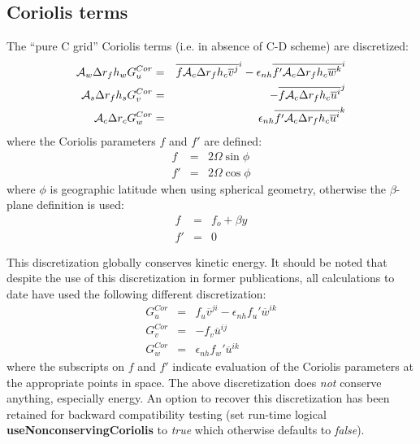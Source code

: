 \subsection{Coriolis terms}

The ``pure C grid'' Coriolis terms (i.e. in absence of C-D scheme) are
discretized:
\begin{eqnarray}
{\cal A}_w \Delta r_f h_w G_u^{Cor} & = &
  \overline{ f {\cal A}_c \Delta r_f h_c \overline{ v }^j }^i
- \epsilon_{nh} \overline{ f' {\cal A}_c \Delta r_f h_c \overline{ w }^k }^i \\
{\cal A}_s \Delta r_f h_s G_v^{Cor} & = &
- \overline{ f {\cal A}_c \Delta r_f h_c \overline{ u }^i }^j \\
{\cal A}_c \Delta r_c G_w^{Cor} & = &
 \epsilon_{nh} \overline{ f' {\cal A}_c \Delta r_f h_c \overline{ u }^i }^k
\end{eqnarray}
where the Coriolis parameters $f$ and $f'$ are defined:
\begin{eqnarray}
f & = & 2 \Omega \sin{\phi} \\
f' & = & 2 \Omega \cos{\phi}
\end{eqnarray}
where $\phi$ is geographic latitude when using spherical geometry,
otherwise the $\beta$-plane definition is used:
\begin{eqnarray}
f & = & f_o + \beta y \\
f' & = & 0
\end{eqnarray}

This discretization globally conserves kinetic energy. It should be
noted that despite the use of this discretization in former
publications, all calculations to date have used the following
different discretization:
\begin{eqnarray}
G_u^{Cor} & = &
  f_u \overline{ v }^{ji}
- \epsilon_{nh} f_u' \overline{ w }^{ik} \\
G_v^{Cor} & = &
- f_v \overline{ u }^{ij} \\
G_w^{Cor} & = &
 \epsilon_{nh} f_w' \overline{ u }^{ik}
\end{eqnarray}
where the subscripts on $f$ and $f'$ indicate evaluation of the
Coriolis parameters at the appropriate points in space. The above
discretization does {\em not} conserve anything, especially energy. An
option to recover this discretization has been retained for backward
compatibility testing (set run-time logical {\bf
useNonconservingCoriolis} to {\em true} which otherwise defaults to
{\em false}).

